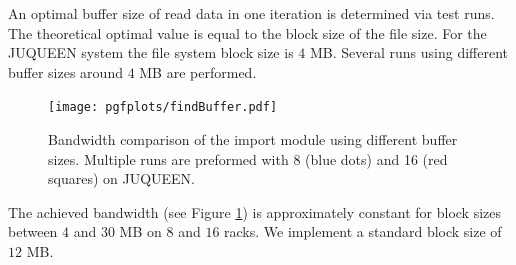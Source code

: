 An optimal buffer size of read data in one iteration is determined via test runs.
The theoretical optimal value is equal to the block size of the file size.
For the JUQUEEN system the file system block size is $4$ MB.
Several runs using different buffer sizes around $4$ MB are performed.
\begin{figure}[h!]
\begin{center}
 \texttt{[image: pgfplots/findBuffer.pdf]}
\end{center}
\caption{Bandwidth comparison of the import module using different buffer sizes.
Multiple runs are preformed with 8 (blue dots) and 16 (red squares) on JUQUEEN.}
\label{schumann:fig:findBuffer}
\end{figure}
The achieved bandwidth (see Figure \ref{schumann:fig:findBuffer}) is approximately constant for block sizes between $4$ and $30$ MB on $8$ and $16$ racks.
We implement a standard block size of $12$ MB.